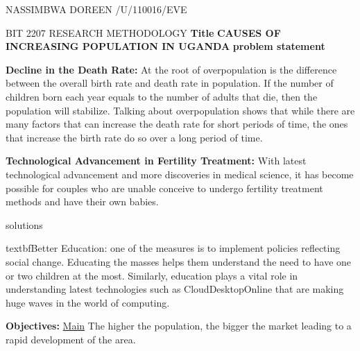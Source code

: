 \documentclass[10pt,a4paper]{article}
\author{Nassimbwa Doreen Patricia}
\begin{document}
\begin{flushright}
NASSIMBWA DOREEN  /U/110016/EVE \newline
\end{flushright}
\begin{center}
BIT 2207 RESEARCH METHODOLOGY \newline
\textbf {Title}\newline 
\textbf {CAUSES OF INCREASING POPULATION IN UGANDA} \newline
\textbf {problem statement}\newline 
\end{center}
\begin{flushleft}\textbf{Decline in the Death Rate:} At the root of overpopulation is the difference between the overall birth rate and death rate in population. If the number of children born each year equals to the number of adults that die, then the population will stabilize. Talking about overpopulation shows that while there are many factors that can increase the death rate for short periods of time, the ones that increase the birth rate do so over a long period of time.\newline
\end{flushleft}
\begin{flushleft}
\textbf{Technological Advancement in Fertility Treatment:} With latest technological advancement and more discoveries in medical science, it has become possible for couples who are unable conceive to undergo fertility treatment methods and have their own babies.\newline
\end{flushleft}
solutions\newline \hfill
\begin{flushleft}
textbf{Better Education:} one of the measures is to implement policies reflecting social change. Educating the masses helps them understand the need to have one or two children at the most. Similarly, education plays a vital role in understanding latest technologies such as CloudDesktopOnline that are making huge waves in the world of computing.\newline
\end{flushleft}
\textbf{Objectives:}\newline
\underline{Main}\newline
The higher the population, the bigger the market leading to a rapid development of the area.\newline
\end{document}

